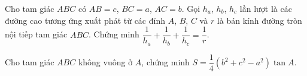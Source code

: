 \begin{bt}%
	Cho tam giác $ABC$ có $AB=c$, $BC=a$, $AC=b$. Gọi $h_a$, $h_b$, $h_c$ lần lượt là các đường cao tương ứng xuất phát từ các đỉnh $A$, $B$, $C$ và $r$ là bán kính đường tròn nội tiếp tam giác $ABC$. Chứng minh $\dfrac{1}{h_a}+\dfrac{1}{h_b}+\dfrac{1}{h_c}=\dfrac{1}{r}$.
\end{bt}

\begin{bt}%
	Cho tam giác $ABC$ không vuông ở $A$, chứng minh $S=\dfrac{1}{4}\left(b^2+c^2-a^2\right)\tan A$.
\end{bt}
